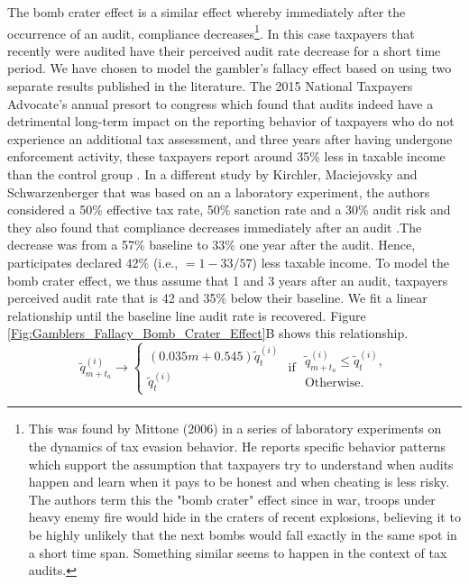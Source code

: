 \documentclass{NSF_proposal_mod}
\begin{document}

The bomb crater effect is a similar effect whereby immediately after the occurrence of an audit, compliance decreases\footnote{This was found by Mittone (2006) in a series of laboratory experiments on the dynamics of tax evasion behavior. He reports specific behavior patterns which support the assumption that taxpayers try to understand when audits happen and learn when it pays to be honest and when cheating is less risky. The authors term this the "bomb crater" effect since in war, troops under heavy enemy fire would hide in the craters of recent explosions, believing it to be highly unlikely that the next bombs would fall exactly in the same spot in a short time span. Something similar seems to happen in the context of tax audits. }.  In this case taxpayers that recently were audited have their perceived audit rate decrease for a short time period. We have chosen to model the gambler's fallacy effect based on using two separate results published in the literature.  The 2015 National Taxpayers Advocate's annual presort to congress which found that audits indeed have a detrimental long-term impact on the reporting behavior of taxpayers who do not experience an additional tax assessment, and three years after having undergone enforcement activity, these taxpayers report around 35\% less in taxable income than the control group \cite{SebastianBeer2016}. In a different study by Kirchler, Maciejovsky and Schwarzenberger that was based on an a laboratory experiment, the authors considered a 50\% effective tax rate, 50\% sanction rate and a 30\% audit risk and they also found that compliance decreases immediately after an audit \cite{Kirchler2003a}.The decrease was from a 57\% baseline to 33\% one year after the audit. Hence, participates declared 42\% (i.e., $=1-33/57$) less taxable income. To model the bomb crater effect,  we thus assume that 1 and 3 years after an audit, taxpayers perceived audit rate that is 42 and 35\% below their baseline. We fit a linear relationship until the baseline line audit rate is recovered. Figure \ref{Fig:Gamblers_Fallacy_Bomb_Crater_Effect}B shows this relationship.  
\begin{equation}
\tilde{q}^{(i)}_{m+t_a} \to 
\left\{ 
\begin{array}{c}
(0.035m+0.545)\tilde{q}^{(i)}_t \\
 \tilde{q}^{(i)}_t 
\end{array} \right .\mbox{ if }
\begin{array}{c}
\tilde{q}^{(i)}_{m+t_a} \le \tilde{q}^{(i)}_t, \\
\mbox{Otherwise.}
\end{array}
\label{eq:Bomb_Crater_Effect}
\end{equation} 
\end{document}
